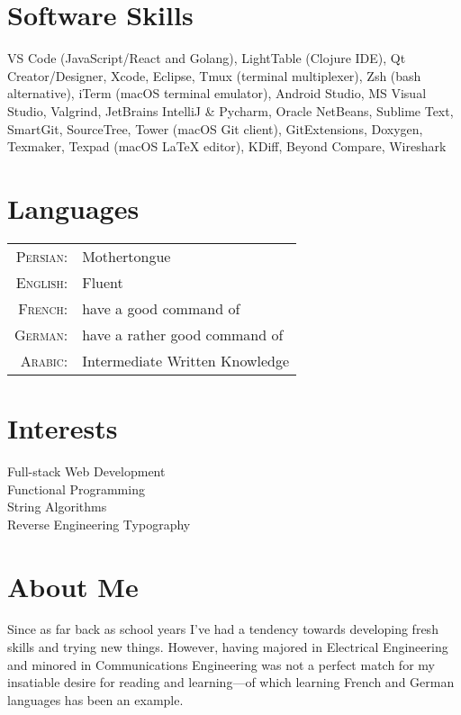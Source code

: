 \documentclass[a4paper,10pt]{article}
\begin{document}
\section{Software Skills}
VS Code (JavaScript/React and Golang), LightTable (Clojure IDE),
Qt Creator/Designer, Xcode, Eclipse, Tmux (terminal multiplexer), Zsh (bash alternative), iTerm (macOS terminal emulator), Android Studio, MS Visual Studio, Valgrind, JetBrains IntelliJ \& Pycharm, Oracle NetBeans, Sublime Text, SmartGit, SourceTree, Tower (macOS Git client), GitExtensions, Doxygen, Texmaker, Texpad (macOS {\fb \LaTeX} editor), KDiff, Beyond Compare, Wireshark

\section{Languages}
\begin{tabular}{rl}
\textsc{Persian:} & Mothertongue\\
\textsc{English:} & Fluent\\
\textsc{French:} & have a good command of\\
\textsc{German:} & have a rather good command of\\
\textsc{Arabic:} & Intermediate Written Knowledge
\end{tabular}

\section{Interests}
Full-stack Web Development\\
Functional Programming\\
String Algorithms\\
Reverse Engineering
Typography

\section{About Me}


Since as far back as school years I've had a tendency towards developing fresh skills and trying new things. However, having majored in Electrical Engineering and minored in Communications Engineering was not a perfect match for my insatiable desire for reading and learning---of which learning French and German languages has been an example.
\end{document}
